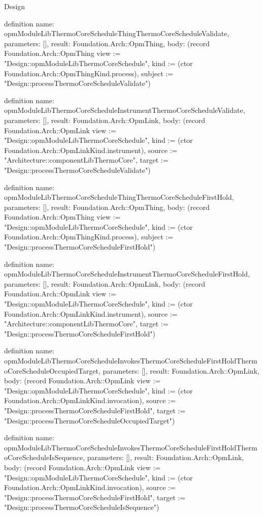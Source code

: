 \begin{lexlean}{Design}
\begin{semanticmodule}
definition{
  name: opmModuleLibThermoCoreScheduleThingThermoCoreScheduleValidate,
  parameters: [],
  result: Foundation.Arch::OpmThing,
  body: (record Foundation.Arch::OpmThing {view := "Design::opmModuleLibThermoCoreSchedule", kind := (ctor Foundation.Arch::OpmThingKind.process), subject := "Design::processThermoCoreScheduleValidate"})
}

definition{
  name: opmModuleLibThermoCoreScheduleInstrumentThermoCoreScheduleValidate,
  parameters: [],
  result: Foundation.Arch::OpmLink,
  body: (record Foundation.Arch::OpmLink {view := "Design::opmModuleLibThermoCoreSchedule", kind := (ctor Foundation.Arch::OpmLinkKind.instrument), source := "Architecture::componentLibThermoCore", target := "Design::processThermoCoreScheduleValidate"})
}

definition{
  name: opmModuleLibThermoCoreScheduleThingThermoCoreScheduleFirstHold,
  parameters: [],
  result: Foundation.Arch::OpmThing,
  body: (record Foundation.Arch::OpmThing {view := "Design::opmModuleLibThermoCoreSchedule", kind := (ctor Foundation.Arch::OpmThingKind.process), subject := "Design::processThermoCoreScheduleFirstHold"})
}

definition{
  name: opmModuleLibThermoCoreScheduleInstrumentThermoCoreScheduleFirstHold,
  parameters: [],
  result: Foundation.Arch::OpmLink,
  body: (record Foundation.Arch::OpmLink {view := "Design::opmModuleLibThermoCoreSchedule", kind := (ctor Foundation.Arch::OpmLinkKind.instrument), source := "Architecture::componentLibThermoCore", target := "Design::processThermoCoreScheduleFirstHold"})
}

definition{
  name: opmModuleLibThermoCoreScheduleInvokesThermoCoreScheduleFirstHoldThermoCoreScheduleOccupiedTarget,
  parameters: [],
  result: Foundation.Arch::OpmLink,
  body: (record Foundation.Arch::OpmLink {view := "Design::opmModuleLibThermoCoreSchedule", kind := (ctor Foundation.Arch::OpmLinkKind.invocation), source := "Design::processThermoCoreScheduleFirstHold", target := "Design::processThermoCoreScheduleOccupiedTarget"})
}

definition{
  name: opmModuleLibThermoCoreScheduleInvokesThermoCoreScheduleFirstHoldThermoCoreScheduleIsSequence,
  parameters: [],
  result: Foundation.Arch::OpmLink,
  body: (record Foundation.Arch::OpmLink {view := "Design::opmModuleLibThermoCoreSchedule", kind := (ctor Foundation.Arch::OpmLinkKind.invocation), source := "Design::processThermoCoreScheduleFirstHold", target := "Design::processThermoCoreScheduleIsSequence"})
}


\end{semanticmodule}
\end{lexlean}
